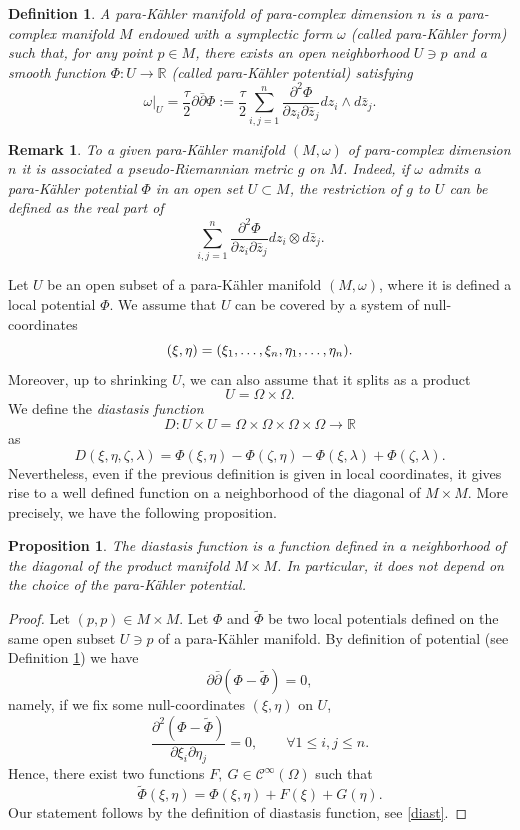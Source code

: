 \documentclass{article}
\newtheorem{df}[thm]{Definition}
\newtheorem{prop}[thm]{Proposition}
\newtheorem{rem}[thm]{Remark}
\newcommand{\R}{\mathds{R}}
\newcommand{\de}{\partial}
\newcommand{\pk}{para-K\"ahler }
\begin{document}
\begin{df}\label{pk}
A \emph{\pk manifold}  of para-complex dimension $n$ is a para-complex manifold $M$ endowed with a symplectic form $\omega$ (called \emph{\pk form}) such that, for any point $p\in M$, there exists an open neighborhood $U\ni p$ and  a smooth function $\Phi:U\to \R$ (called \emph{\pk potential}) satisfying
$$\omega|_{U}= \frac{\tau}{2}\de\bar\de\Phi:=\frac{\tau}{2}\sum_{i,j=1}^n\frac{\de^2\Phi}{\de z_i\de \bar z_j}dz_i\wedge d\bar z_j.$$ 
\end{df}
\begin{rem}
To a given \pk manifold $(M ,\omega)$  of para-complex dimension $n$ it is associated a pseudo-Riemannian  metric $g$ on $M$. Indeed, if $\omega$ admits a \pk potential $\Phi$ in an open set $U\subset M$, the restriction of $g$ to $U$ can be defined as the real part of 
$$\sum_{i,j=1}^n\frac{\de^2\Phi}{\de z_i\de \bar z_j}dz_i\otimes d\bar z_j.$$ 
\end{rem}
Let  $U$ be an open subset of a \pk manifold  $(M,\omega)$,  where it is defined a local potential $\Phi$. We  assume that $U$ can be covered by a system of null-coordinates 
$$(\xi,\eta)=(\xi_1,\mathellipsis,\xi_n,\eta_1,\mathellipsis,\eta_n).$$
 Moreover, up to shrinking $U$, we can also assume that it splits as a product 
$$U=\Omega\times \Omega.$$  
 We define the \emph{diastasis function}
$$D:U\times U=\Omega\times\Omega\times\Omega\times\Omega\to\R$$
as
\begin{equation}\label{diast}
D\left(\xi,\eta,\zeta,\lambda\right)=\Phi(\xi,\eta)-\Phi(\zeta,\eta)-\Phi(\xi,\lambda)+\Phi(\zeta,\lambda).
\end{equation}
Nevertheless, even if the previous definition is given in local coordinates, it gives rise to a well defined function on a neighborhood of the diagonal of $M\times M$. More precisely, we have the following proposition.
\begin{prop}\label{uniqueness}
The diastasis function is a function defined in a neighborhood of the diagonal of the product manifold $M\times M$. In particular, it does not depend on the choice of the \pk potential.
\end{prop}
\begin{proof}
Let $(p,p)\in M\times M$.
Let $\Phi$ and $\tilde \Phi$ be two local potentials defined on the same open subset $U\ni p$ of a \pk manifold. By definition of potential (see Definition \ref{pk}) 
 we have
$$\de\bar\de(\Phi-\tilde\Phi)=0,$$
namely, if we fix some null-coordinates $(\xi,\eta)$ on $U$, 
$$\frac{\de^2(\Phi-\tilde\Phi)}{\de\xi_i\de\eta_j}=0,\qquad \forall 1\leq i,j\leq n.$$
Hence, there exist two functions $F,\ G\in\mathcal{C}^\infty(\Omega)$ such that 
$$\tilde \Phi (\xi,\eta)=\Phi(\xi,\eta)+F(\xi)+G(\eta).$$
Our statement  follows by the definition of diastasis function, see \eqref{diast}.
\end{proof}
\end{document}

